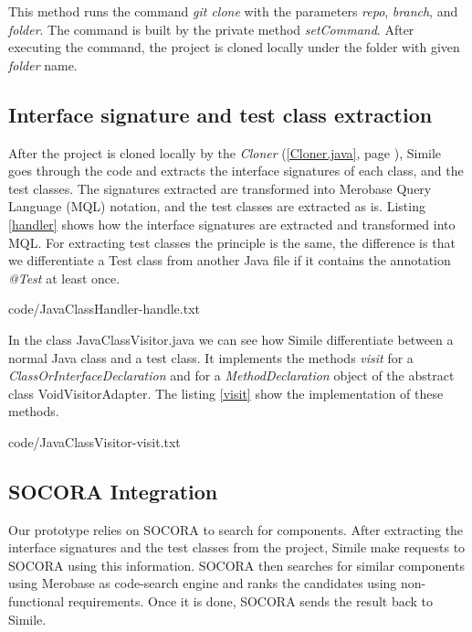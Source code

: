 This method runs the command \emph{git clone} with the parameters \emph{repo}, \emph{branch}, and \emph{folder}. The command is built by the private method \emph{setCommand}. After executing the command, the project is cloned locally under the folder with given \emph{folder} name.

\subsection{Interface signature and test class extraction}
\label{simile:code-analysis}
After the project is cloned locally by the \emph{Cloner} (\ref{Cloner.java}, page \pageref{Cloner.java}), Simile goes through the code and extracts the interface signatures of each class, and the test classes. The signatures extracted are transformed into Merobase Query Language (MQL) notation, and the test classes are extracted as is. Listing \ref{handler} shows how the interface signatures are extracted and transformed into MQL. For extracting test classes the principle is the same, the difference is that we differentiate a Test class from another Java file if it contains the annotation \emph{@Test} at least once.


{code/JavaClassHandler-handle.txt}

In the class JavaClassVisitor.java we can see how Simile differentiate between a normal Java class and a test class. It implements the methods \emph{visit} for a \emph{ClassOrInterfaceDeclaration} and for a \emph{MethodDeclaration} object of the abstract class VoidVisitorAdapter. The listing \ref{visit} show the implementation of these methods.


{code/JavaClassVisitor-visit.txt}

\subsection{SOCORA Integration}
\label{socora-integration}
Our prototype relies on SOCORA to search for components. After extracting the interface signatures and the test classes from the project, Simile make requests to SOCORA using this information. SOCORA then searches for similar components using Merobase as code-search engine and ranks the candidates using non-functional requirements. Once it is done, SOCORA sends the result back to Simile.

